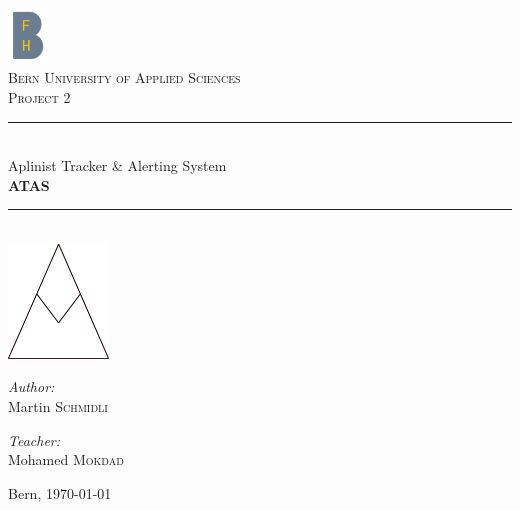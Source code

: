 \documentclass[a4paper,11pt, oneside]{report}
\theoremstyle{definition}
\begin{document}
\pagestyle{empty} %
\begin{titlepage}
\begin{center}

\includegraphics[width=0.08\textwidth]{img/bfh_logo.png}\\[1cm]    
\textsc{\LARGE Bern University of Applied Sciences}\\[1.5cm]
\textsc{\Large Project 2}\\[0.5cm]

\newcommand{\HRule}{\rule{\linewidth}{0.3mm}}
\HRule \\[0.4cm]
{\huge Aplinist Tracker \& Alerting System}\\[0.3cm]
{\huge \bfseries  ATAS}
\HRule \\[2cm]

\includegraphics[width=0.2\textwidth]{img/atas_logo.png}\\[3cm]    

\begin{minipage}{0.4\textwidth}
\begin{flushleft} \large
\emph{Author:}\\
Martin \textsc{Schmidli}\\
\end{flushleft}
\end{minipage}
\hfill
\begin{minipage}{0.4\textwidth}
\begin{flushright} \large
\emph{Teacher:} \\
Mohamed \textsc{Mokdad}
\end{flushright}
\end{minipage}
\vfill

Bern, {\large \today}
\end{center}
\end{titlepage}
\pagestyle {plain}

\tableofcontents
\end{document}
